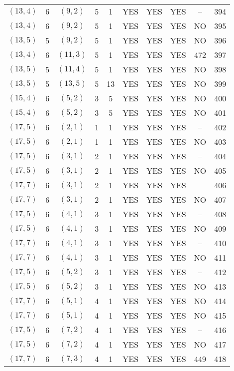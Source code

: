 \begin{longtable}{|c|c|c|c|c|c|c|c|c|c|}
$(13, 4)$ & 6 & $(9, 2)$ & 5 & 1 & YES & YES & YES & -- & 394\\
$(13, 4)$ & 6 & $(9, 2)$ & 5 & 1 & YES & YES & YES & NO & 395\\
$(13, 5)$ & 5 & $(9, 2)$ & 5 & 1 & YES & YES & YES & NO & 396\\
$(13, 4)$ & 6 & $(11, 3)$ & 5 & 1 & YES & YES & YES & 472 & 397\\
$(13, 5)$ & 5 & $(11, 4)$ & 5 & 1 & YES & YES & YES & NO & 398\\
$(13, 5)$ & 5 & $(13, 5)$ & 5 & 13 & YES & YES & YES & NO & 399\\
$(15, 4)$ & 6 & $(5, 2)$ & 3 & 5 & YES & YES & YES & NO & 400\\
$(15, 4)$ & 6 & $(5, 2)$ & 3 & 5 & YES & YES & YES & NO & 401\\
$(17, 5)$ & 6 & $(2, 1)$ & 1 & 1 & YES & YES & YES & -- & 402\\
$(17, 5)$ & 6 & $(2, 1)$ & 1 & 1 & YES & YES & YES & NO & 403\\
$(17, 5)$ & 6 & $(3, 1)$ & 2 & 1 & YES & YES & YES & -- & 404\\
$(17, 5)$ & 6 & $(3, 1)$ & 2 & 1 & YES & YES & YES & NO & 405\\
$(17, 7)$ & 6 & $(3, 1)$ & 2 & 1 & YES & YES & YES & -- & 406\\
$(17, 7)$ & 6 & $(3, 1)$ & 2 & 1 & YES & YES & YES & NO & 407\\
$(17, 5)$ & 6 & $(4, 1)$ & 3 & 1 & YES & YES & YES & -- & 408\\
$(17, 5)$ & 6 & $(4, 1)$ & 3 & 1 & YES & YES & YES & NO & 409\\
$(17, 7)$ & 6 & $(4, 1)$ & 3 & 1 & YES & YES & YES & -- & 410\\
$(17, 7)$ & 6 & $(4, 1)$ & 3 & 1 & YES & YES & YES & NO & 411\\
$(17, 5)$ & 6 & $(5, 2)$ & 3 & 1 & YES & YES & YES & -- & 412\\
$(17, 5)$ & 6 & $(5, 2)$ & 3 & 1 & YES & YES & YES & NO & 413\\
$(17, 7)$ & 6 & $(5, 1)$ & 4 & 1 & YES & YES & YES & NO & 414\\
$(17, 7)$ & 6 & $(5, 1)$ & 4 & 1 & YES & YES & YES & NO & 415\\
$(17, 5)$ & 6 & $(7, 2)$ & 4 & 1 & YES & YES & YES & -- & 416\\
$(17, 5)$ & 6 & $(7, 2)$ & 4 & 1 & YES & YES & YES & NO & 417\\
$(17, 7)$ & 6 & $(7, 3)$ & 4 & 1 & YES & YES & YES & 449 & 418\\

\end{longtable}
